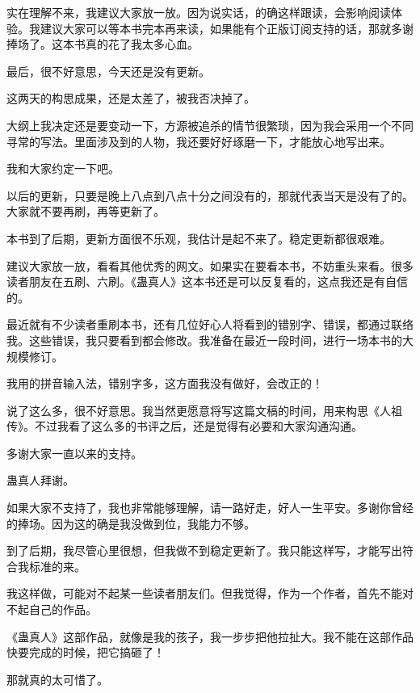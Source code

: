\begin{this_body}
实在理解不来，我建议大家放一放。因为说实话，的确这样跟读，会影响阅读体验。我建议大家可以等本书完本再来读，如果能有个正版订阅支持的话，那就多谢捧场了。这本书真的花了我太多心血。

最后，很不好意思，今天还是没有更新。

这两天的构思成果，还是太差了，被我否决掉了。

大纲上我决定还是要变动一下，方源被追杀的情节很繁琐，因为我会采用一个不同寻常的写法。里面涉及到的人物，我还要好好琢磨一下，才能放心地写出来。

我和大家约定一下吧。

以后的更新，只要是晚上八点到八点十分之间没有的，那就代表当天是没有了的。大家就不要再刷，再等更新了。

本书到了后期，更新方面很不乐观，我估计是起不来了。稳定更新都很艰难。

建议大家放一放，看看其他优秀的网文。如果实在要看本书，不妨重头来看。很多读者朋友在五刷、六刷。《蛊真人》这本书还是可以反复看的，这点我还是有自信的。

最近就有不少读者重刷本书，还有几位好心人将看到的错别字、错误，都通过联络我。这些错误，我只要看到都会修改。我准备在最近一段时间，进行一场本书的大规模修订。

我用的拼音输入法，错别字多，这方面我没有做好，会改正的！

说了这么多，很不好意思。我当然更愿意将写这篇文稿的时间，用来构思《人祖传》。不过我看了这么多的书评之后，还是觉得有必要和大家沟通沟通。

多谢大家一直以来的支持。

蛊真人拜谢。

如果大家不支持了，我也非常能够理解，请一路好走，好人一生平安。多谢你曾经的捧场。因为这的确是我没做到位，我能力不够。

到了后期，我尽管心里很想，但我做不到稳定更新了。我只能这样写，才能写出符合我标准的来。

我这样做，可能对不起某一些读者朋友们。但我觉得，作为一个作者，首先不能对不起自己的作品。

《蛊真人》这部作品，就像是我的孩子，我一步步把他拉扯大。我不能在这部作品快要完成的时候，把它搞砸了！

那就真的太可惜了。

\end{this_body}
